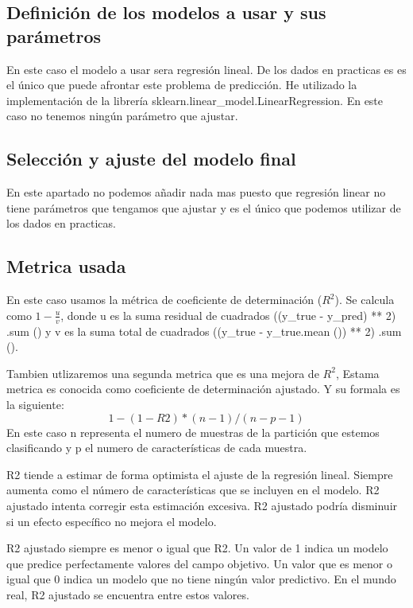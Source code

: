 \documentclass[titlepage]{article}
\begin{document}
\subsection{Definición de los modelos a usar y sus parámetros}
En este caso el modelo a usar sera regresión lineal. De los dados en practicas es es el único que puede afrontar este problema de predicción. He utilizado la implementación de la librería sklearn.linear\_model.LinearRegression. En este caso no tenemos ningún parámetro que ajustar.

\subsection{Selección y ajuste del modelo final}
En este apartado no podemos añadir nada mas puesto que regresión linear no tiene parámetros que tengamos que ajustar y es el único que podemos utilizar de los dados en practicas.

\subsection{Metrica usada}
En este caso usamos la métrica de coeficiente de determinación ($R^2$). Se calcula como $1-\frac{u}{v}$, donde u es la suma residual de cuadrados ((y\_true - y\_pred) ** 2) .sum () y v es la suma total de cuadrados ((y\_true - y\_true.mean ()) ** 2) .sum (). 

Tambien utlizaremos una segunda metrica que es una mejora de $R^2$, Estama metrica es conocida como coeficiente de determinación ajustado. Y su formala es la siguiente:
$$
	1-(1-R 2) *(n-1) /(n-p-1)
$$
En este caso n representa el numero de muestras de la partición que estemos clasificando y p el numero de características de cada muestra.

R2 tiende a estimar de forma optimista el ajuste de la regresión lineal. Siempre aumenta como el número de características que se incluyen en el modelo. R2 ajustado intenta corregir esta estimación excesiva. R2 ajustado podría disminuir si un efecto específico no mejora el modelo. 

R2 ajustado siempre es menor o igual que R2. Un valor de 1 indica un modelo que predice perfectamente valores del campo objetivo. Un valor que es menor o igual que 0 indica un modelo que no tiene ningún valor predictivo. En el mundo real, R2 ajustado se encuentra entre estos valores. 
\end{document}
